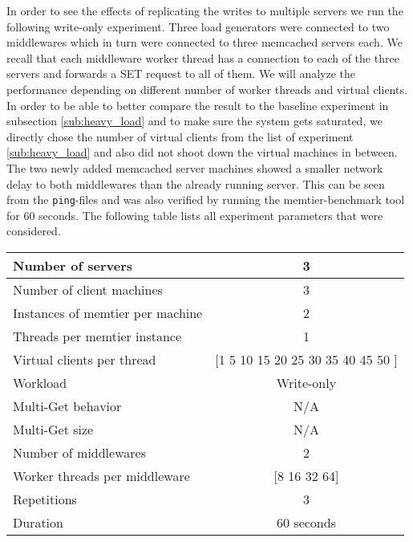 \documentclass[11pt,a4paper]{article}
\let\tt\texttt
\begin{document}
In order to see the effects of replicating the writes to multiple servers we run the following write-only experiment. Three load generators were connected to two middlewares which in turn were connected to three memcached servers each. We recall that each middleware worker thread has a connection to each of the three servers and forwards a SET request to all of them. We will analyze the performance depending on different number of worker threads and virtual clients. In order to be able to better compare the result to the baseline experiment in subsection \ref{sub:heavy_load} and to make sure the system gets saturated, we directly chose the number of virtual clients from the list of experiment \ref{sub:heavy_load} and also did not shoot down the virtual machines in between. The two newly added memcached server machines showed a smaller network delay to both middlewares than the already running server. This can be seen from the \tt{ping}-files and was also verified by running the memtier-benchmark tool for 60 seconds. The following table lists all experiment parameters that were considered.

\begin{center}
	\scriptsize{
		\begin{tabular}{|l|c|}
			\hline Number of servers                & 3          \\ 
			\hline Number of client machines        & 3          \\ 
			\hline Instances of memtier per machine & 2          \\ 
			\hline Threads per memtier instance     & 1          \\
			\hline Virtual clients per thread       & [1 5 10 15 20 25 30 35 40 45 50 ]    \\ 
			\hline Workload                         & Write-only \\
			\hline Multi-Get behavior               & N/A        \\
			\hline Multi-Get size                   & N/A        \\
			\hline Number of middlewares            & 2          \\
			\hline Worker threads per middleware    & [8 16 32 64]    \\
			\hline Repetitions                      & 3  \\
			\hline Duration                         & 60 seconds \\
			\hline 
		\end{tabular}
	} 
\end{center}
\end{document}
